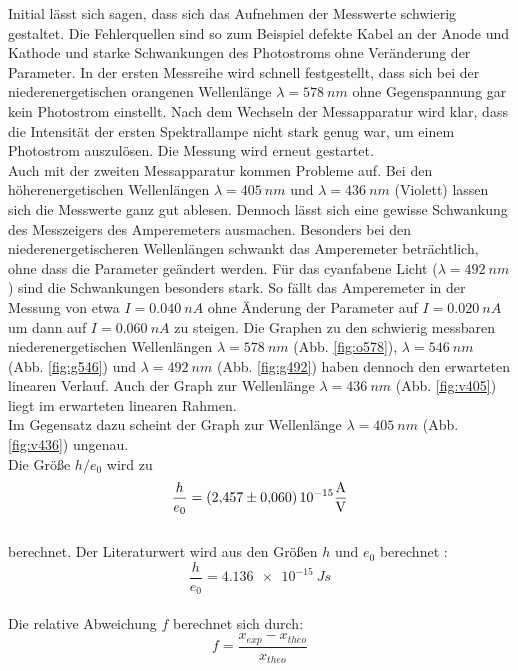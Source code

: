 Initial lässt sich sagen, dass sich das Aufnehmen der Messwerte schwierig gestaltet.
Die Fehlerquellen sind so zum Beispiel defekte Kabel an der Anode und Kathode und starke Schwankungen des Photostroms ohne Veränderung der Parameter.
In der ersten Messreihe wird schnell festgestellt, dass sich bei der niederenergetischen orangenen Wellenlänge $\lambda=\SI{578}{nm}$ ohne Gegenspannung gar kein Photostrom einstellt.
Nach dem Wechseln der Messapparatur wird klar, dass die Intensität der ersten Spektrallampe nicht stark genug war, um einem Photostrom auszulösen.
Die Messung wird erneut gestartet.
\\Auch mit der zweiten Messapparatur kommen Probleme auf.
Bei den höherenergetischen Wellenlängen $\lambda=\SI{405}{nm}$ und $\lambda=\SI{436}{nm}$ (Violett) lassen sich die Messwerte ganz gut ablesen.
Dennoch lässt sich eine gewisse Schwankung des Messzeigers des Amperemeters ausmachen.
Besonders bei den niederenergetischeren Wellenlängen schwankt das Amperemeter beträchtlich, ohne dass die Parameter geändert werden.
Für das cyanfabene Licht ($\lambda=\SI{492}{nm}$) sind die Schwankungen besonders stark.
So fällt das Amperemeter in der Messung von etwa $I=\SI{0.040}{nA}$ ohne Änderung der Parameter auf $I=\SI{0.020}{nA}$ um dann auf $I=\SI{0.060}{nA}$ zu steigen.
Die Graphen zu den schwierig messbaren niederenergetischen Wellenlängen $\lambda=\SI{578}{nm}$ (Abb. \ref{fig:o578}), $\lambda=\SI{546}{nm}$ (Abb. \ref{fig:g546}) und $\lambda=\SI{492}{nm}$ (Abb. \ref{fig:g492}) haben dennoch den erwarteten linearen Verlauf.
Auch der Graph zur Wellenlänge $\lambda=\SI{436}{nm}$ (Abb. \ref{fig:v405}) liegt im erwarteten linearen Rahmen.
\\Im Gegensatz dazu scheint der Graph zur Wellenlänge $\lambda=\SI{405}{nm}$ (Abb. \ref{fig:v436}) ungenau.
\\Die Größe $h/e_0$ wird zu
\begin{equation*}
  \frac{h}{e_0} = \SI{2.457 \pm 0.060} 10^{-15}\si{\frac{A}{V}}
\end{equation*}
\\berechnet.
Der Literaturwert wird aus den Größen $h$ und $e_0$ berechnet \cite{taschenrechner}:
\begin{equation*}
  \frac{h}{e_0}=\SI{4.136e-15}{Js}
\end{equation*}
\\Die relative Abweichung $f$ berechnet sich durch:
\begin{equation*}
  f=\frac{x_{exp}-x_{theo}}{x_{theo}}
\end{equation*}
